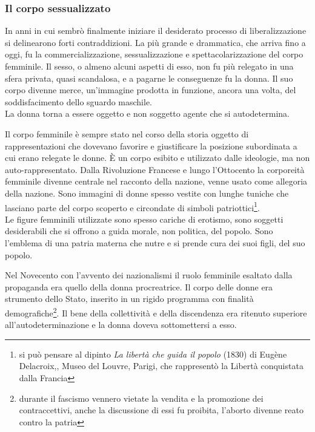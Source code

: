 \subsubsection{Il corpo sessualizzato}
In anni in cui sembrò finalmente iniziare il desiderato processo di liberalizzazione si delinearono forti contraddizioni.
La più grande e drammatica, che arriva fino a oggi, fu la commercializzazione, sessualizzazione e  spettacolarizzazione del corpo femminile.
Il sesso, o almeno alcuni aspetti di esso, non fu più relegato in una sfera privata, quasi scandalosa, e a pagarne le conseguenze fu la donna.
Il suo corpo divenne merce, un'immagine prodotta in funzione, ancora una volta, del soddisfacimento dello sguardo maschile.
\\La donna torna a essere oggetto e non soggetto agente che si autodetermina.

Il corpo femminile è sempre stato nel corso della storia oggetto di rappresentazioni che dovevano favorire e giustificare la posizione subordinata a cui erano relegate le donne.
È un corpo esibito e utilizzato dalle ideologie, ma non auto-rappresentato.
Dalla Rivoluzione Francese e lungo l'Ottocento la corporeità femminile divenne centrale nel racconto della nazione, venne usato come allegoria della nazione.
Sono immagini di donne spesso vestite con lunghe tuniche che lasciano parte del corpo scoperto e circondate di simboli patriottici\footnote{si può pensare al dipinto \textit{La libertà che guida il popolo} (1830) di Eugène Delacroix,, Museo del Louvre, Parigi, che rappresentò la Libertà conquistata dalla Francia}.
\\Le figure femminili utilizzate sono spesso cariche di erotismo, sono soggetti desiderabili che si offrono a guida morale, non politica, del popolo.
Sono l'emblema di una patria materna che nutre e si prende cura dei suoi figli, del suo popolo.

Nel Novecento con l'avvento dei nazionalismi il ruolo femminile esaltato dalla propaganda era quello della donna procreatrice.
Il corpo delle donne era strumento dello Stato, inserito in un rigido programma con finalità demografiche\footnote{durante il fascismo vennero vietate la vendita e la promozione dei contraccettivi, anche la discussione di essi fu proibita, l'aborto divenne reato contro la patria}.
Il bene della collettività e della discendenza era ritenuto superiore all'autodeterminazione e la donna doveva sottomettersi a esso.

